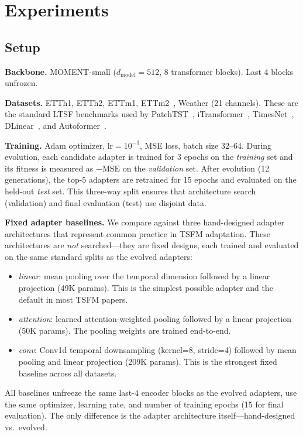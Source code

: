 \documentclass{article}
\begin{document}
\section{Experiments}

\subsection{Setup}

\textbf{Backbone.} MOMENT-small ($d_\text{model}{=}512$, 8 transformer blocks). Last 4 blocks unfrozen.

\textbf{Datasets.} ETTh1, ETTh2, ETTm1, ETTm2~\cite{zhou2021informer}, Weather (21 channels). These are the standard LTSF benchmarks used by PatchTST~\cite{nie2023patchtst}, iTransformer~\cite{liu2024itransformer}, TimesNet~\cite{wu2023timesnet}, DLinear~\cite{zeng2023dlinear}, and Autoformer~\cite{wu2021autoformer}.

\textbf{Training.} Adam optimizer, lr$=10^{-3}$, MSE loss, batch size 32--64. During evolution, each candidate adapter is trained for 3 epochs on the \textit{training} set and its fitness is measured as $-\text{MSE}$ on the \textit{validation} set. After evolution (12 generations), the top-5 adapters are retrained for 15 epochs and evaluated on the held-out \textit{test} set. This three-way split ensures that architecture search (validation) and final evaluation (test) use disjoint data.

\textbf{Fixed adapter baselines.} We compare against three hand-designed adapter architectures that represent common practice in TSFM adaptation. These architectures are \textit{not} searched---they are fixed designs, each trained and evaluated on the same standard splits as the evolved adapters:
\begin{itemize}
    \item \textit{linear}: mean pooling over the temporal dimension followed by a linear projection (49K params). This is the simplest possible adapter and the default in most TSFM papers.
    \item \textit{attention}: learned attention-weighted pooling followed by a linear projection (50K params). The pooling weights are trained end-to-end.
    \item \textit{conv}: Conv1d temporal downsampling (kernel=8, stride=4) followed by mean pooling and linear projection (209K params). This is the strongest fixed baseline across all datasets.
\end{itemize}
All baselines unfreeze the same last-4 encoder blocks as the evolved adapters, use the same optimizer, learning rate, and number of training epochs (15 for final evaluation). The only difference is the adapter architecture itself---hand-designed vs.\ evolved.
\end{document}
